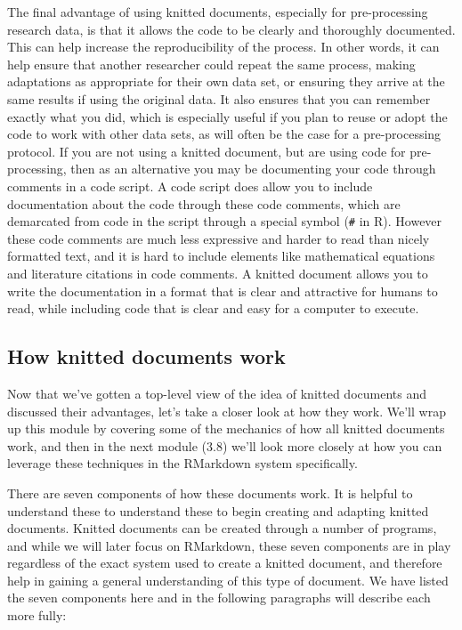 \documentclass[]{tufte-book}
\begin{document}
The final advantage of using knitted documents, especially for pre-processing
research data, is that it allows the code to be clearly and thoroughly
documented. This can help increase the reproducibility of the process. In
other words, it can help ensure that another researcher could repeat the same
process, making adaptations as appropriate for their own data set, or ensuring
they arrive at the same results if using the original data. It also ensures that
you can remember exactly what you did, which is especially useful if you plan to
reuse or adopt the code to work with other data sets, as will often be the case
for a pre-processing protocol. If you are not using a knitted document, but are
using code for pre-processing, then as an alternative you may be documenting your
code through comments in a code script. A code script does allow you to include
documentation about the code through these code comments, which are demarcated
from code in the script through a special symbol (\texttt{\#} in R). However these code
comments are much less expressive and harder to read than nicely formatted text,
and it is hard to include elements like mathematical equations and literature
citations in code comments. A knitted document allows you to write the
documentation in a format that is clear and attractive for humans to read, while
including code that is clear and easy for a computer to execute.

\subsection{How knitted documents work}\label{how-knitted-documents-work}

Now that we've gotten a top-level view of the idea of knitted documents and
discussed their advantages, let's take a closer look at how they work. We'll
wrap up this module by covering some of the mechanics of how all knitted
documents work, and then in the next module (3.8) we'll look more closely at how
you can leverage these techniques in the RMarkdown system specifically.

There are seven components of how these documents work. It is helpful to
understand these to understand these to begin creating and adapting knitted
documents. Knitted documents can be created through a number of programs, and
while we will later focus on RMarkdown, these seven components are in play
regardless of the exact system used to create a knitted document, and therefore
help in gaining a general understanding of this type of document. We have listed
the seven components here and in the following paragraphs will describe each
more fully:
\end{document}
